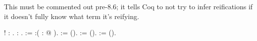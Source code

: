 This must be commented out pre-8.6; it tells Coq to not try to
    infer reifications if it doesn't fully know what term it's
    reifying. \begin{coqdoccode}
\coqdocemptyline
\coqdocnoindent
{}   ! : .\coqdoceol
\coqdocnoindent
{}   : .\coqdoceol
\coqdocemptyline
\coqdocnoindent
{}   :=\coqdoceol
\coqdocindent{1.00em}
:(\coqdocvar{\_} : @ ).\coqdoceol
\coqdocemptyline
\coqdocnoindent
{}  \coqdocvar{\_} :=    ().\coqdoceol
\coqdocnoindent
{}  \coqdocvar{\_} :=  ().\coqdoceol
\coqdocnoindent
{}  \coqdocvar{\_} :=   ().\coqdoceol
\end{coqdoccode}

